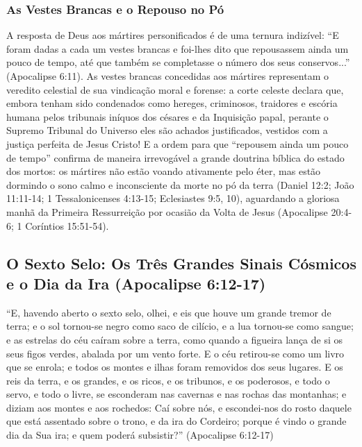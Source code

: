 \documentclass[11pt,a4paper,openany]{book}
\begin{document}
\subsubsection*{As Vestes Brancas e o Repouso no Pó}
A resposta de Deus aos mártires personificados é de uma ternura indizível:
``E foram dadas a cada um vestes brancas e foi-lhes dito que repousassem ainda um pouco de tempo, até que também se completasse o número dos seus conservos...'' (Apocalipse 6:11).
As vestes brancas concedidas aos mártires representam o veredito celestial de sua vindicação moral e forense: a corte celeste declara que, embora tenham sido condenados como hereges, criminosos, traidores e escória humana pelos tribunais iníquos dos césares e da Inquisição papal, perante o Supremo Tribunal do Universo eles são achados justificados, vestidos com a justiça perfeita de Jesus Cristo!
E a ordem para que ``repousem ainda um pouco de tempo'' confirma de maneira irrevogável a grande doutrina bíblica do estado dos mortos: os mártires não estão voando ativamente pelo éter, mas estão dormindo o sono calmo e inconsciente da morte no pó da terra (Daniel 12:2; João 11:11-14; 1 Tessalonicenses 4:13-15; Eclesiastes 9:5, 10), aguardando a gloriosa manhã da Primeira Ressurreição por ocasião da Volta de Jesus (Apocalipse 20:4-6; 1 Coríntios 15:51-54).



\subsection{O Sexto Selo: Os Três Grandes Sinais Cósmicos e o Dia da Ira (Apocalipse 6:12-17)}


``E, havendo aberto o sexto selo, olhei, e eis que houve um grande tremor de terra; e o sol tornou-se negro como saco de cilício, e a lua tornou-se como sangue; e as estrelas do céu caíram sobre a terra, como quando a figueira lança de si os seus figos verdes, abalada por um vento forte. E o céu retirou-se como um livro que se enrola; e todos os montes e ilhas foram removidos dos seus lugares. E os reis da terra, e os grandes, e os ricos, e os tribunos, e os poderosos, e todo o servo, e todo o livre, se esconderam nas cavernas e nas rochas das montanhas; e diziam aos montes e aos rochedos: Caí sobre nós, e escondei-nos do rosto daquele que está assentado sobre o trono, e da ira do Cordeiro; porque é vindo o grande dia da Sua ira; e quem poderá subsistir?'' (Apocalipse 6:12-17)
\end{document}
